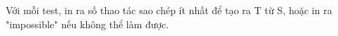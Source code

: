 Với mỗi test, in ra số thao tác sao chép ít nhất để tạo ra T từ S, hoặc in ra "impossible" nếu không thể làm được.  

\